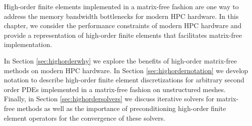 High-order finite elements implemented in a matrix-free fashion are one way to address the memory bandwidth bottlenecks for modern HPC hardware.
In this chapter, we consider the performance constraints of modern HPC hardware and provide a representation of high-order finite elements that facilitates matrix-free implementation.

In Section \ref{sec:highorderwhy} we explore the benefits of high-order matrix-free methods on modern HPC hardware.
In Section \ref{sec:highordernotation} we develop notation to describe high-order finite element discretizations for arbitrary second order PDEs implemented in a matrix-free fashion on unstructured meshes.
Finally, in Section \ref{sec:highordersolvers} we discuss iterative solvers for matrix-free methods as well as the importance of preconditioning high-order finite element operators for the convergence of these solvers.
